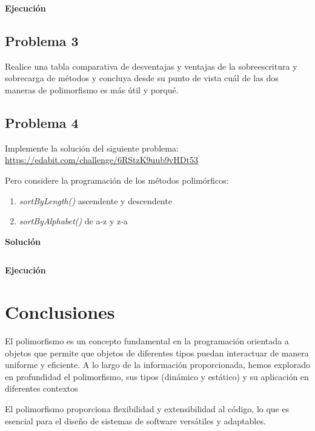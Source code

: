 \documentclass[11pt, twocolumn]{article}
\begin{document}
  \textbf{Ejecución}

  \subsection*{Problema 3}
  Realice una tabla comparativa de desventajas y ventajas de la sobreescritura y sobrecarga de métodos y concluya desde su punto de vista cuál de las dos maneras de polimorfismo es más útil y porqué.

  
  \subsection*{Problema 4}
  Implemente la solución del siguiente problema: \url{https://edabit.com/challenge/6RStzK9uub9vHDt53}

  Pero considere la programación de los métodos polimórficos:

  \begin{enumerate}[label=\alph*.]
    \item \textit{sortByLength()} ascendente y descendente
    \item \textit{sortByAlphabet()} de a-z y z-a
  \end{enumerate}

  \textbf{Solución}
  \begin{lstlisting}

  \end{lstlisting}

  \textbf{Ejecución}

  \section*{Conclusiones}
  El polimorfismo es un concepto fundamental en la programación orientada a objetos que permite que objetos de diferentes tipos puedan interactuar de manera uniforme y eficiente. A lo largo de la información proporcionada, hemos explorado en profundidad el polimorfismo, sus tipos (dinámico y estático) y su aplicación en diferentes contextos
  
  El polimorfismo proporciona flexibilidad y extensibilidad al código, lo que es esencial para el diseño de sistemas de software versátiles y adaptables.
\end{document}
